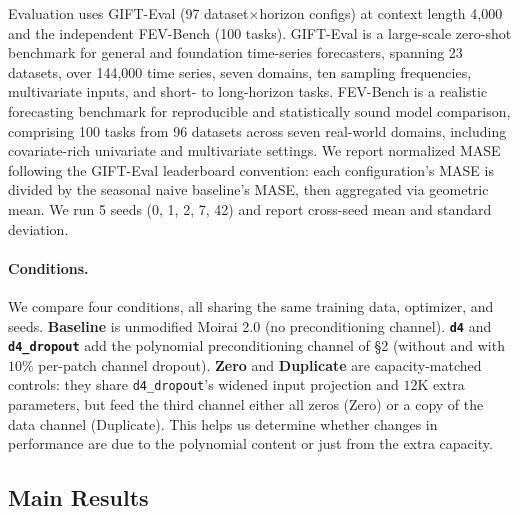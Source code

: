 \documentclass{article}
\begin{document}
Evaluation uses GIFT-Eval \citep{vijay2024gifteval} (97 dataset$\times$horizon configs) at context length 4{,}000 and the independent FEV-Bench \citep{shchur2025fevbench} (100 tasks). GIFT-Eval is a large-scale zero-shot benchmark for general and foundation time-series forecasters, spanning 23 datasets, over 144{,}000 time series, seven domains, ten sampling frequencies, multivariate inputs, and short- to long-horizon tasks. FEV-Bench is a realistic forecasting benchmark for reproducible and statistically sound model comparison, comprising 100 tasks from 96 datasets across seven real-world domains, including covariate-rich univariate and multivariate settings. We report normalized MASE following the GIFT-Eval leaderboard convention: each configuration's MASE is divided by the seasonal naive baseline's MASE, then aggregated via geometric mean. We run 5 seeds (0, 1, 2, 7, 42) and report cross-seed mean and standard deviation.

\paragraph{Conditions.} We compare four conditions, all sharing the same training data, optimizer, and seeds. \textbf{Baseline} is unmodified Moirai 2.0 (no preconditioning channel). \textbf{\texttt{d4}} and \textbf{\texttt{d4\_dropout}} add the polynomial preconditioning channel of \S2 (without and with $10\%$ per-patch channel dropout). \textbf{Zero} and \textbf{Duplicate} are capacity-matched controls: they share \texttt{d4\_dropout}'s widened input projection and $12$K extra parameters, but feed the third channel either all zeros (Zero) or a copy of the data channel (Duplicate). This helps us determine whether changes in performance are due to the polynomial content or just from the extra capacity. 

\subsection{Main Results}
\end{document}
